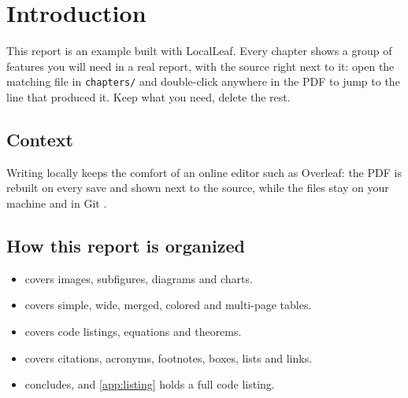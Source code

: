 \chapter{Introduction}
\label{chap:introduction}

This report is an example built with LocalLeaf. Every chapter shows a group
of features you will need in a real report, with the source right next to
it: open the matching file in \texttt{chapters/} and double-click anywhere in
the \ac{PDF} to jump to the line that produced it. Keep what you need, delete
the rest.

\section{Context}

Writing locally keeps the comfort of an online editor such as Overleaf: the
\ac{PDF} is rebuilt on every save and shown next to the source, while the
files stay on your machine and in Git \cite{lamport1994latex}.

\section{How this report is organized}

\begin{itemize}
  \item {} covers images, subfigures, diagrams and charts.
  \item {} covers simple, wide, merged, colored and multi-page tables.
  \item {} covers code listings, equations and theorems.
  \item {} covers citations, acronyms, footnotes, boxes, lists and links.
  \item {} concludes, and \cref{app:listing} holds a full code listing.
\end{itemize}
